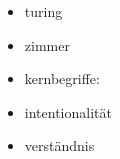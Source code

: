\documentclass[a4paper, emulatestandardclasses, 12pt]{scrartcl}
\begin{document}
\begin{onehalfspace}
\begin{itemize}
  \item turing
  \item zimmer
  \item kernbegriffe: 
  \item intentionalität
  \item verständnis
\end{itemize}

\vspace{3mm}




\end{onehalfspace}
\nocite{*}

\end{document}
